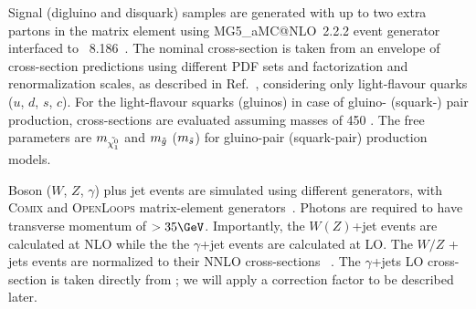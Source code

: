{\color{red}
Signal (digluino and disquark) samples are generated with up to two extra partons in the matrix element using MG5\_aMC@NLO~2.2.2 event generator~\cite{Alwall:2014hca} interfaced to  \pythia~8.186~\cite{Sjostrand:2014zea}.
The nominal cross-section is taken from an envelope of cross-section predictions using different PDF sets and factorization and renormalization scales, as described in Ref.~\cite{Kramer:2012bx}, considering only light-flavour quarks ($u$, $d$, $s$, $c$).
For the light-flavour squarks (gluinos) in case of gluino- (squark-) pair production, cross-sections are evaluated assuming masses of 450 \TeV.
The free parameters are $m_{\tilde{\chi^0_1}}$ and $m_{\tilde{g}}$ ($m_{\tilde{s}}$) for gluino-pair (squark-pair) production models.

Boson ($W$, $Z$, $\gamma$) plus jet events are simulated using different \sherpa generators, with \textsc{Comix} and \textsc{OpenLoops} matrix-element generators~\cite{ATL-PHYS-PUB-2016-003, comix, openloops}.
Photons are required to have transverse momentum of $> 35 \GeV$.
Importantly, the $W (Z)$+jet events are calculated at NLO while the the $\gamma$+jet events are calculated at LO.
The $W/Z$ + jets events are normalized to their NNLO cross-sections ~\cite{Catani:2009sm}.
The $\gamma$+jets LO cross-section is taken directly from \sherpa; we will apply a correction factor to be described later.

}
